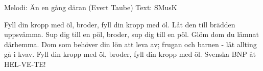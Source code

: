 \begin{song}

\begin{songmeta}
Melodi: Än en gång däran (Evert Taube)
Text: SMusK
\end{songmeta}

\begin{songtext}
Fyll din kropp med öl, broder,
fyll din kropp med öl.
Låt den till brädden uppsvämma.
Sup dig till en pöl, broder,
sup dig till en pöl.
Glöm dom du lämnat därhemma.
Dom som behöver din lön att leva av;
frugan och barnen - låt allting gå i kvav.
Fyll din kropp med öl, broder,
fyll din kropp med öl.
Svenska BNP åt HEL-VE-TE!
\end{songtext}

\begin{songnotes}
\end{songnotes}

\end{song}

